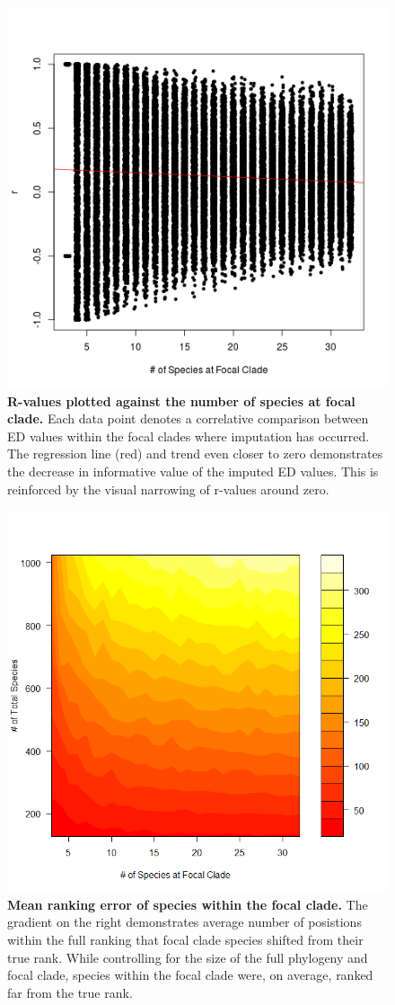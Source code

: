 \documentclass[12pt,english]{article}
\begin{document}
\begin{figure}[!ht]
  \center
  \includegraphics[width=.5\textwidth]{edModel.png}
  \caption{\textbf{R-values plotted against the number of species at focal clade.} 
  Each data point denotes a correlative comparison between ED values within the focal 
  clades where imputation has occurred. The regression line (red) and trend even closer to zero 
  demonstrates the decrease in informative value of the imputed ED values. This is reinforced 
  by the visual narrowing of r-values around zero.}
  \label{imputationTrend}
\end{figure}

\begin{figure}[!ht]
  \center
  \includegraphics[width=.5\textwidth]{rankingError.png}
  \caption{\textbf{Mean ranking error of species within the focal clade.} The 
  gradient on the right demonstrates average number of posistions within the 
  full ranking that focal clade species shifted from their true rank.
  While controlling for the size of the full phylogeny and focal clade, species 
  within the focal clade were, on average, ranked far from the true rank. }
  \label{rankingError}
\end{figure}
\end{document}
